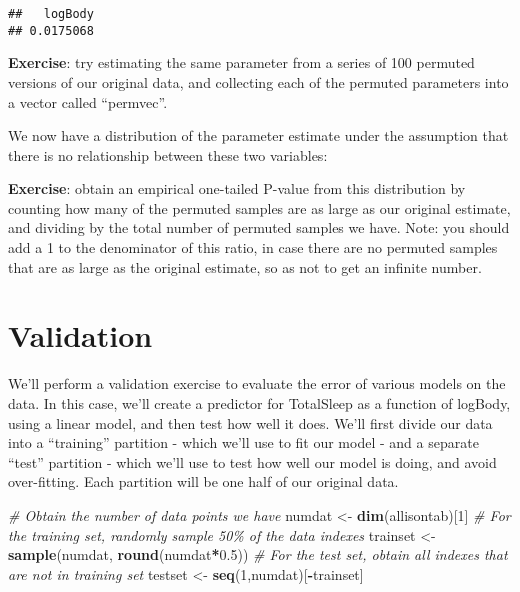 \documentclass[
]{book}
\newenvironment{Shaded}{\begin{snugshade}}{\end{snugshade}}
\newcommand{\CommentTok}[1]{\textcolor[rgb]{0.56,0.35,0.01}{\textit{#1}}}
\newcommand{\DataTypeTok}[1]{\textcolor[rgb]{0.13,0.29,0.53}{#1}}
\newcommand{\DecValTok}[1]{\textcolor[rgb]{0.00,0.00,0.81}{#1}}
\newcommand{\FloatTok}[1]{\textcolor[rgb]{0.00,0.00,0.81}{#1}}
\newcommand{\KeywordTok}[1]{\textcolor[rgb]{0.13,0.29,0.53}{\textbf{#1}}}
\newcommand{\NormalTok}[1]{#1}
\newcommand{\OperatorTok}[1]{\textcolor[rgb]{0.81,0.36,0.00}{\textbf{#1}}}
\newcommand{\StringTok}[1]{\textcolor[rgb]{0.31,0.60,0.02}{#1}}
\begin{document}
\begin{Shaded}
\end{Shaded}

\begin{verbatim}
##   logBody 
## 0.0175068
\end{verbatim}

\textbf{Exercise}: try estimating the same parameter from a series of 100 permuted versions of our original data, and collecting each of the permuted parameters into a vector called ``permvec''.

We now have a distribution of the parameter estimate under the assumption that there is no relationship between these two variables:

\textbf{Exercise}: obtain an empirical one-tailed P-value from this distribution by counting how many of the permuted samples are as large as our original estimate, and dividing by the total number of permuted samples we have. Note: you should add a 1 to the denominator of this ratio, in case there are no permuted samples that are as large as the original estimate, so as not to get an infinite number.

\hypertarget{validation}{%
\section{Validation}\label{validation}}

We'll perform a validation exercise to evaluate the error of various models on the data. In this case, we'll create a predictor for TotalSleep as a function of logBody, using a linear model, and then test how well it does. We'll first divide our data into a ``training'' partition - which we'll use to fit our model - and a separate ``test'' partition - which we'll use to test how well our model is doing, and avoid over-fitting. Each partition will be one half of our original data.

\begin{Shaded}
\begin{Highlighting}[]
\CommentTok{\# Obtain the number of data points we have}
\NormalTok{numdat \textless{}{-}}\StringTok{ }\KeywordTok{dim}\NormalTok{(allisontab)[}\DecValTok{1}\NormalTok{]}
\CommentTok{\# For the training set, randomly sample 50\% of the data indexes}
\NormalTok{trainset \textless{}{-}}\StringTok{ }\KeywordTok{sample}\NormalTok{(numdat, }\KeywordTok{round}\NormalTok{(numdat}\OperatorTok{*}\FloatTok{0.5}\NormalTok{))}
\CommentTok{\# For the test set, obtain all indexes that are not in training set}
\NormalTok{testset \textless{}{-}}\StringTok{ }\KeywordTok{seq}\NormalTok{(}\DecValTok{1}\NormalTok{,numdat)[}\OperatorTok{{-}}\NormalTok{trainset]}
\end{Highlighting}
\end{Shaded}
\end{document}
